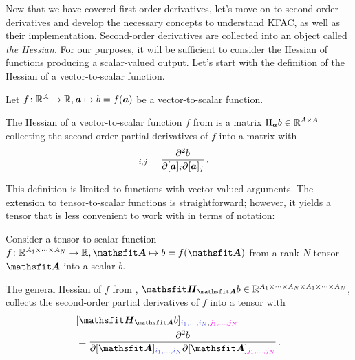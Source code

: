 Now that we have covered first-order derivatives, let's move on to second-order derivatives and develop the necessary concepts to understand KFAC, as well as their implementation.
Second-order derivatives are collected into an object called \emph{the Hessian}.
For our purposes, it will be sufficient to consider the Hessian of functions producing a scalar-valued output.
Let's start with the definition of the Hessian of a vector-to-scalar function.

\begin{setup}\label{setup:vector_to_scalar_function}
  Let $f\colon {\mathbb{R}}^A \to {\mathbb{R}}, {\bm{a}} \mapsto b = f({\bm{a}})$ be a vector-to-scalar function.
\end{setup}

\begin{definition}\label{def:vector_hessian}
  The Hessian of a vector-to-scalar function $f$ from  is a matrix $\mathrm{H}_{{\bm{a}}}b \in {\mathbb{R}}^{A \times A}$ collecting the second-order partial derivatives of $f$ into a matrix with
  \begin{align*}
    [\hess_{\va}b]_{i,j}
     & =
    \frac{\partial^2 b}{\partial [\va]_i \partial [\va]_j}\,.
  \end{align*}
\end{definition}
This definition is limited to functions with vector-valued arguments. The extension to tensor-to-scalar functions is straightforward; however, it yields a tensor that is less convenient to work with in terms of notation:

\begin{setup}\label{setup:hessians}
  Consider a tensor-to-scalar function $f\colon \sR^{A_1 \times \dots \times A_N} \to \sR, \tA \mapsto b = f(\tA)$ from a rank-$N$ tensor $\tA$ into a scalar $b$.
\end{setup}

\begin{definition}\label{def:general_hessian}
  The general Hessian of $f$ from , $\tH_{\tA}b \in \sR^{A_1 \times \dots \times A_N \times A_1 \times \dots \times A_N}$, collects the second-order partial derivatives of $f$ into a tensor with
  \begin{align*}
     & [\tH_{\tA}b]_{\colored{i_1, \dots, i_N}, \colored[VectorPink]{j_1, \dots, j_N}}
    \\
     & =
    \frac{\partial^2 b}{\partial [\tA]_{\colored{i_1, \dots, i_N}} \partial [\tA]_{\colored[VectorPink]{j_1, \dots, j_N}}}\,.
  \end{align*}
\end{definition}

